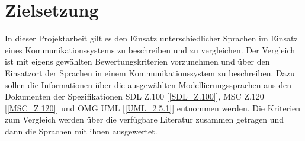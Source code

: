 \section{Zielsetzung}
\label{sc:Zielsetzung}
In dieser Projektarbeit gilt es den Einsatz unterschiedlicher Sprachen im Einsatz eines Kommunikationssystems zu beschreiben und zu vergleichen. Der Vergleich ist mit eigens gewählten Bewertungskriterien vorzunehmen und über den Einsatzort der Sprachen in einem Kommunikationssystem zu beschreiben. Dazu sollen die Informationen über die ausgewählten Modellierungssprachen aus den Dokumenten der Spezifikationen \acs{SDL} Z.100 [\ref{SDL_Z.100}], \acs{MSC} Z.120 [\ref{MSC_Z.120}] und OMG \acs{UML} [\ref{UML_2.5.1}] entnommen werden. Die Kriterien zum Vergleich werden über die verfügbare Literatur zusammen getragen und dann die Sprachen mit ihnen ausgewertet.
